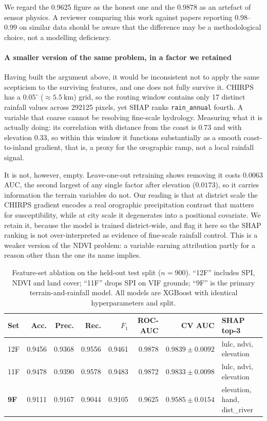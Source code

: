 \documentclass[10pt,twocolumn]{article}
\begin{document}
We regard the 0.9625 figure as the honest one and the 0.9878 as an artefact of
sensor physics. A reviewer comparing this work against papers reporting
0.98--0.99 on similar data should be aware that the difference may be a
methodological choice, not a modelling deficiency.

\paragraph{A smaller version of the same problem, in a factor we retained}
Having built the argument above, it would be inconsistent not to apply the same
scepticism to the surviving features, and one does not fully survive it. CHIRPS
has a $0.05^\circ$ ($\approx\SI{5.5}{\kilo\metre}$) grid, so the routing window
contains only 17 distinct rainfall values across \num{292125} pixels, yet SHAP
ranks \texttt{rain\_annual} fourth. A variable that coarse cannot be resolving
fine-scale hydrology. Measuring what it is actually doing: its correlation with
distance from the coast is $0.73$ and with elevation $0.33$, so within this
window it functions substantially as a smooth coast-to-inland gradient, that is,
a proxy for the orographic ramp, not a local rainfall signal.

It is not, however, empty. Leave-one-out retraining shows removing it costs
$0.0063$ AUC, the second largest of any single factor after elevation
($0.0173$), so it carries information the terrain variables do not. Our reading
is that at district scale the CHIRPS gradient encodes a real orographic
precipitation contrast that matters for susceptibility, while at city scale it
degenerates into a positional covariate. We retain it, because the model is
trained district-wide, and flag it here so the SHAP ranking is not
over-interpreted as evidence of fine-scale rainfall control. This is a weaker
version of the NDVI problem: a variable earning attribution partly for a reason
other than the one its name implies.

\begin{table}[!t]
\centering\footnotesize
\caption{Feature-set ablation on the held-out test split ($n=900$). ``12F''
includes SPI, NDVI and land cover; ``11F'' drops SPI on VIF grounds; ``9F'' is
the primary terrain-and-rainfall model. All models are XGBoost with identical
hyperparameters and split.}
\label{tab:ablation}
\small
\begin{tabular}{@{}lrrrrrrl@{}}
\toprule
\textbf{Set} & \textbf{Acc.} & \textbf{Prec.} & \textbf{Rec.} & \textbf{$F_1$} &
\textbf{ROC-AUC} & \textbf{CV AUC} & \textbf{SHAP top-3} \\
\midrule
12F & 0.9456 & 0.9368 & 0.9556 & 0.9461 & 0.9878 & $0.9839\pm0.0092$ & lulc, ndvi, elevation \\
11F & 0.9478 & 0.9390 & 0.9578 & 0.9483 & 0.9872 & $0.9833\pm0.0098$ & lulc, ndvi, elevation \\
\textbf{9F} & 0.9111 & 0.9167 & 0.9044 & 0.9105 & 0.9625 & $0.9585\pm0.0154$ & elevation, hand, dist\_river \\
\bottomrule
\end{tabular}
\end{table}
\end{document}
